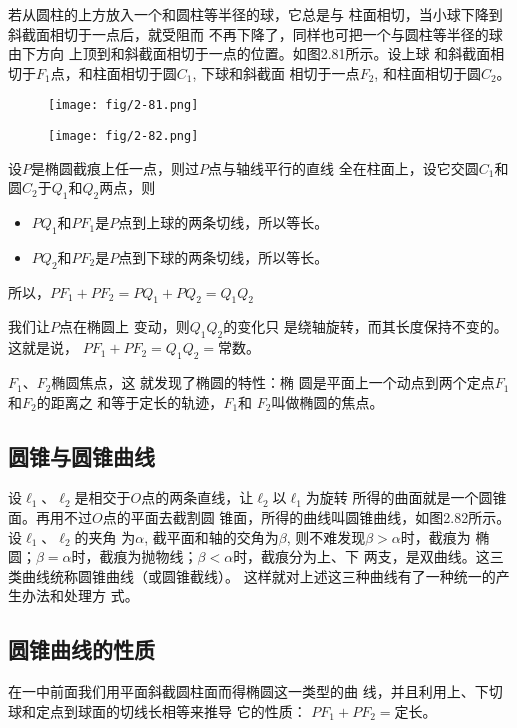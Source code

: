 若从圆柱的上方放入一个和圆柱等半径的球，它总是与
柱面相切，当小球下降到斜截面相切于一点后，就受阻而
不再下降了，同样也可把一个与圆柱等半径的球由下方向
上顶到和斜截面相切于一点的位置。如图2.81所示。设上球
和斜截面相切于$F_1$点，和柱面相切于圆$C_1$, 下球和斜截面
相切于一点$F_2$, 和柱面相切于圆$C_2$。

\begin{figure}[htp]\centering
    \begin{minipage}[t]{0.48\textwidth}
    \centering
\texttt{[image: fig/2-81.png]}
    \caption{}
    \end{minipage}
    \begin{minipage}[t]{0.48\textwidth}
    \centering
\texttt{[image: fig/2-82.png]}
    \caption{}
    \end{minipage}
    \end{figure}

设$P$是椭圆截痕上任一点，则过$P$点与轴线平行的直线
全在柱面上，设它交圆$C_1$和圆$C_2$于$Q_1$和$Q_2$两点，则
\begin{itemize}
    \item $PQ_1$和$PF_1$是$P$点到上球的两条切线，所以等长。
    \item   $PQ_2$和$PF_2$是$P$点到下球的两条切线，所以等长。
\end{itemize}

所以，$PF_1+PF_2=PQ_1+PQ_2=Q_1Q_2$

我们让$P$点在椭圆上
变动，则$Q_1Q_2$的变化只
是绕轴旋转，而其长度保持不变的。这就是说，
$PF_1+PF_2=Q_1Q_2=$常数。

$F_1$、$F_2$椭圆焦点，这
就发现了椭圆的特性：椭
圆是平面上一个动点到两个定点$F_1$和$F_2$的距离之
和等于定长的轨迹，$F_1$和
$F_2$叫做椭圆的焦点。

\subsection{圆锥与圆锥曲线}

设$\ell_1$、$\ell_2$是相交于$O$点的两条直线，让$\ell_2$以$\ell_1$为旋转
所得的曲面就是一个圆锥面。再用不过$O$点的平面去截割圆
锥面，所得的曲线叫圆锥曲线，如图2.82所示。设$\ell_1$、$\ell_2$的夹角
为$\alpha$, 截平面和轴的交角为$\beta$, 则不难发现$\beta>\alpha$时，截痕为
椭圆；$\beta=\alpha$时，截痕为抛物线；$\beta<\alpha$时，截痕分为上、下
两支，是双曲线。这三类曲线统称圆锥曲线（或圆锥截线）。
这样就对上述这三种曲线有了一种统一的产生办法和处理方
式。

\subsection{圆锥曲线的性质}
在一中前面我们用平面斜截圆柱面而得椭圆这一类型的曲
线，并且利用上、下切球和定点到球面的切线长相等来推导
它的性质：
$PF_1+PF_2=$定长。

